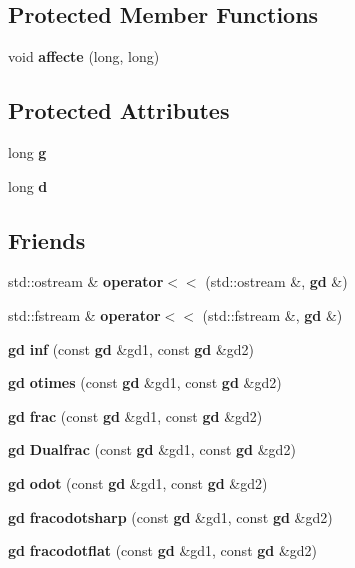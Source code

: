 \subsection*{Protected Member Functions}
\begin{DoxyCompactItemize}
\item 
\mbox{\label{classmmgd_1_1mmgd_1_1gd_a9f0cbddb58f4e9e1c89d03263589af88}} 
void {\bfseries affecte} (long, long)
\end{DoxyCompactItemize}
\subsection*{Protected Attributes}
\begin{DoxyCompactItemize}
\item 
\mbox{\label{classmmgd_1_1mmgd_1_1gd_a4024f130e5a50e587b45abe3089a3f48}} 
long {\bfseries g}
\item 
\mbox{\label{classmmgd_1_1mmgd_1_1gd_a562fe0e70d06e4324fa81d0e3737a509}} 
long {\bfseries d}
\end{DoxyCompactItemize}
\subsection*{Friends}
\begin{DoxyCompactItemize}
\item 
\mbox{\label{classmmgd_1_1mmgd_1_1gd_ae6debbf0c1df1dfa98cc657c12c878c1}} 
std\+::ostream \& {\bfseries operator$<$$<$} (std\+::ostream \&, \textbf{ gd} \&)
\item 
\mbox{\label{classmmgd_1_1mmgd_1_1gd_a2652ce1c0563883317a07fd500b1c6ff}} 
std\+::fstream \& {\bfseries operator$<$$<$} (std\+::fstream \&, \textbf{ gd} \&)
\item 
\mbox{\label{classmmgd_1_1mmgd_1_1gd_a359420ee0032329d8d8273b9fc01d0b7}} 
\textbf{ gd} {\bfseries inf} (const \textbf{ gd} \&gd1, const \textbf{ gd} \&gd2)
\item 
\mbox{\label{classmmgd_1_1mmgd_1_1gd_a673acceac37b151854972a1851d1e546}} 
\textbf{ gd} {\bfseries otimes} (const \textbf{ gd} \&gd1, const \textbf{ gd} \&gd2)
\item 
\mbox{\label{classmmgd_1_1mmgd_1_1gd_a3f4a2aa21f57e46b13660bd83cffa8c4}} 
\textbf{ gd} {\bfseries frac} (const \textbf{ gd} \&gd1, const \textbf{ gd} \&gd2)
\item 
\mbox{\label{classmmgd_1_1mmgd_1_1gd_a2dd6930af5ca5df0fcb2b684b415c72c}} 
\textbf{ gd} {\bfseries Dualfrac} (const \textbf{ gd} \&gd1, const \textbf{ gd} \&gd2)
\item 
\mbox{\label{classmmgd_1_1mmgd_1_1gd_a7f189133bc654eb0b9d129cae50b343a}} 
\textbf{ gd} {\bfseries odot} (const \textbf{ gd} \&gd1, const \textbf{ gd} \&gd2)
\item 
\mbox{\label{classmmgd_1_1mmgd_1_1gd_a4e07c2d7bbd16afdfa616eb51f368b9f}} 
\textbf{ gd} {\bfseries fracodotsharp} (const \textbf{ gd} \&gd1, const \textbf{ gd} \&gd2)
\item 
\mbox{\label{classmmgd_1_1mmgd_1_1gd_a204321412b18107581b1d547a931d1ff}} 
\textbf{ gd} {\bfseries fracodotflat} (const \textbf{ gd} \&gd1, const \textbf{ gd} \&gd2)
\end{DoxyCompactItemize}


